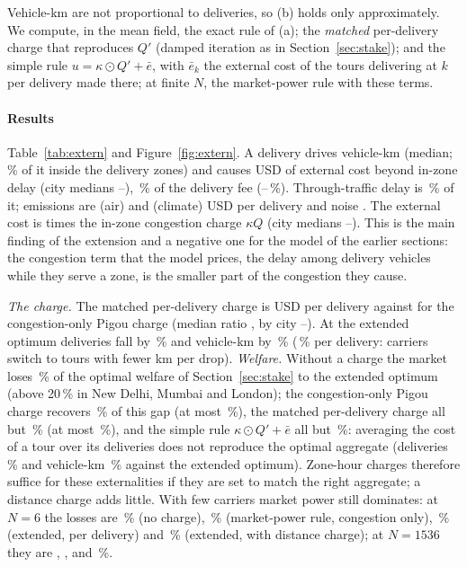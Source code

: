 Vehicle-km are not proportional to deliveries, so (b) holds only approximately. We compute, in the mean field, the exact rule of (a); the \emph{matched} per-delivery charge that reproduces $Q'$ (damped iteration as in Section~\ref{sec:stake}); and the simple rule $u=\kappa\odot Q'+\bar e$, with $\bar e_k$ the external cost of the tours delivering at $k$ per delivery made there; at finite $N$, the market-power rule with these terms.



\paragraph{Results} Table~\ref{tab:extern} and Figure~\ref{fig:extern}. A delivery drives \ExtVkmDel{} vehicle-km (median; \ExtVkmInShare\,\% of it inside the delivery zones) and causes \ExtPerE{} USD of external cost beyond in-zone delay (city medians \ExtPerEMin--\ExtPerEMax), \ExtShareFee\,\% of the delivery fee (\ExtShareFeeMin--\ExtShareFeeMax\,\%). Through-traffic delay is \ExtShareCong\,\% of it; emissions are \ExtPerAir{} (air) and \ExtPerClim{} (climate) USD per delivery and noise \ExtPerNoise. The external cost is \ExtRatioKQ{} times the in-zone congestion charge $\kappa Q$ (city medians \ExtRatioKQMin--\ExtRatioKQMax). This is the main finding of the extension and a negative one for the model of the earlier sections: the congestion term that the model prices, the delay among delivery vehicles while they serve a zone, is the smaller part of the congestion they cause.

\emph{The charge.} The matched per-delivery charge is \ExtChargeMatch{} USD per delivery against \ExtChargeCong{} for the congestion-only Pigou charge (median ratio \ExtChargeRatio, by city \ExtChargeRatioMin--\ExtChargeRatioMax). At the extended optimum deliveries fall by \ExtDQ\,\% and vehicle-km by \ExtDVkm\,\% (\ExtDVkmPerDel\,\% per delivery: carriers switch to tours with fewer km per drop). \emph{Welfare.} Without a charge the market loses \ExtLossNone\,\% of the optimal welfare of Section~\ref{sec:stake} to the extended optimum (above 20\,\% in New Delhi, Mumbai and London); the congestion-only Pigou charge recovers \ExtGainCongShare\,\% of this gap (at most \ExtGainCongShareMax\,\%), the matched per-delivery charge all but \ExtLossMatch\,\% (at most \ExtLossMatchMax\,\%), and the simple rule $\kappa\odot Q'+\bar e$ all but \ExtLossEbar\,\%: averaging the cost of a tour over its deliveries does not reproduce the optimal aggregate (deliveries \ExtEbarDQ\,\% and vehicle-km \ExtEbarDVkm\,\% against the extended optimum). Zone-hour charges therefore suffice for these externalities if they are set to match the right aggregate; a distance charge adds little. With few carriers market power still dominates: at $N=6$ the losses are \ExtSixNone\,\% (no charge), \ExtSixPmCong\,\% (market-power rule, congestion only), \ExtSixPmMatch\,\% (extended, per delivery) and \ExtSixPmTour\,\% (extended, with distance charge); at $N=1536$ they are \ExtBigNone, \ExtBigPmCong, \ExtBigPmMatch{} and \ExtBigPmTour\,\%.

